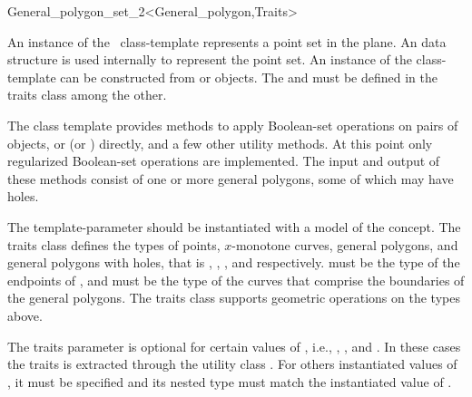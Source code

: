 \ccRefPageBegin

\begin{ccRefClass}{General_polygon_set_2<General_polygon,Traits>}

\ccThreeToTwo
    
\ccDefinition
An instance of the \ccClassTemplateName\ class-template represents a
point set in the plane. An  data structure is used
internally to represent the point set. An instance of the
 class-template can be constructed from 
 or  objects.
The  and  must
be defined in the traits class among the other.

The class template provides methods to apply Boolean-set operations on
pairs of  objects, or 
(or ) directly, and a few other utility
methods. At this point only regularized Boolean-set operations are
implemented. The input and output of these methods consist of one or
more general polygons, some of which may have holes.

The  template-parameter should be instantiated with a
model of the  concept. The traits class
defines the types of points, $x$-monotone curves, general polygons,
and general polygons with holes, that is ,
, , and
 respectively.  must
be the type of the endpoints of , and
 must be the type of the curves that comprise
the boundaries of the general polygons. The traits class supports
geometric operations on the types above.

The traits parameter is optional for certain values of ,
i.e., , , and .
In these cases the traits is extracted through the utility class
. For others
instantiated values of , it must be specified and its
nested type  must match the instantiated
value of .

\ccTypes
\ccGlue
{}
\ccGlue
{} 


\end{ccRefClass}
